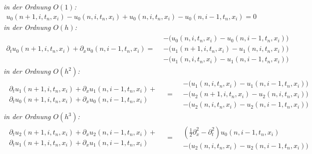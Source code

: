 \vspace{0.4cm}
\noindent \emph{in der Ordnung $O(1)$:}
\begin{align}\label{eq:transport:kleineta:o1}
u_0(n+1, i, t_n, x_i) - u_0(n, i, t_n, x_i) + u_0(n, i, t_n, x_i) - u_0(n, i-1, t_n, x_i) = 0
\end{align}
\vspace{0.4cm}
\noindent \emph{in der Ordnung $O(h)$:}
\begin{align}\label{eq:transport:kleineta:oh}
\partial_t u_0(n+1, i, t_n, x_i) + \partial_x u_0(n, i-1, t_n, x_i) =
\begin{split}
&- \bigl( u_0(n, i, t_n, x_i) - u_0(n, i-1, t_n, x_i) \bigr)\\
&- \bigl( u_1(n+1, i, t_n, x_i) - u_1(n, i, t_n, x_i) \bigr)\\
&- \bigl( u_1(n, i, t_n, x_i) - u_1(n, i-1, t_n, x_i) \bigr)
\end{split}
\end{align}
\vspace{0.4cm}
\noindent \emph{in der Ordnung $O(h^2)$:}
\begin{align}\label{eq:transport:kleineta:oh2}
\begin{split}
\partial_t u_1(n+1, i, t_n, x_i) + \partial_x u_1(n, i-1, t_n, x_i) +\\
\partial_t u_0(n+1, i, t_n, x_i) + \partial_x u_0(n, i-1, t_n, x_i)
\end{split}
&=
\begin{split}
&- \bigl( u_1(n, i, t_n, x_i) - u_1(n, i-1, t_n, x_i) \bigr)\\
&- \bigl( u_2(n+1, i, t_n, x_i) - u_2(n, i, t_n, x_i) \bigr)\\
&- \bigl( u_2(n, i, t_n, x_i) - u_2(n, i-1, t_n, x_i) \bigr)
\end{split}
\end{align}
\vspace{0.4cm}
\noindent \emph{in der Ordnung $O(h^3)$:}
\begin{align}\label{eq:transport:kleineta:oh3}
\begin{split}
\partial_t u_2(n+1, i, t_n, x_i) + \partial_x u_2(n, i-1, t_n, x_i) +\\
\partial_t u_1(n+1, i, t_n, x_i) + \partial_x u_1(n, i-1, t_n, x_i)
\end{split}
&=
\begin{split}
&\left( \frac{1}{2} \partial^2_x  - \partial^2_t \right) u_0(n, i-1, t_n, x_i) \\
&- \bigl( u_2(n, i, t_n, x_i) - u_2(n, i-1, t_n, x_i) \bigr)
\end{split}
\end{align}
